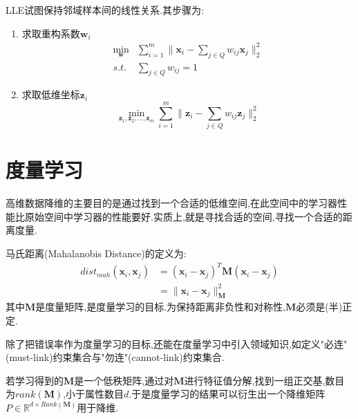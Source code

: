 LLE试图保持邻域样本间的线性关系.其步骤为:
\begin{enumerate}
\item 求取重构系数$\mathbf{w}_i$
\begin{equation}\begin{split}
\min_{\mathbf{w}}&\sum_{i=1}^m\|\mathbf{x}_i-\sum_{j\in Q}w_{ij}\mathbf{x}_j\|^2_2\\
s.t.& \sum_{j\in Q}w_{ij}=1
\end{split}\end{equation}
\item 求取低维坐标$\mathbf{z}_i$
\begin{equation}
\min_{\mathbf{z}_1, \mathbf{z}_2, \dots, \mathbf{z}_m}\sum_{i=1}^m\|\mathbf{z}_i-\sum_{j\in Q}w_{ij}\mathbf{z}_j\|_2^2
\end{equation}
\end{enumerate}

\section{度量学习}

高维数据降维的主要目的是通过找到一个合适的低维空间,在此空间中的学习器性能比原始空间中学习器的性能要好.实质上,就是寻找合适的空间,寻找一个合适的距离度量.

马氏距离(Mahalanobis Distance)的定义为:
\begin{equation}\begin{split}
dist_{mah}(\mathbf{x}_i, \mathbf{x}_j)&=(\mathbf{x}_i -\mathbf{x}_j)^T\mathbf{M}(\mathbf{x}_i -\mathbf{x}_j)\\&=\|\mathbf{x}_i -\mathbf{x}_j\|_{\mathbf{M}}^2
\end{split}\end{equation}
其中$\mathbf{M}$是度量矩阵,是度量学习的目标.为保持距离非负性和对称性,$\mathbf{M}$必须是(半)正定.

除了把错误率作为度量学习的目标,还能在度量学习中引入领域知识,如定义"必连"(must-link)约束集合与"勿连"(cannot-link)约束集合.

若学习得到的$\mathbf{M}$是一个低秩矩阵,通过对$\mathbf{M}$进行特征值分解,找到一组正交基,数目为$rank(\mathbf{M})$,小于属性数目$d$.于是度量学习的结果可以衍生出一个降维矩阵$P\in\mathbb{R}^{d\times Rank(\mathbf{M})}$用于降维.